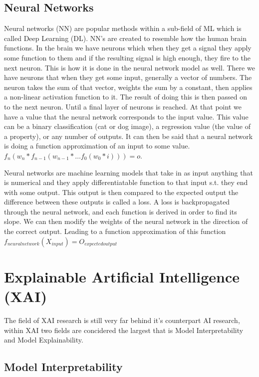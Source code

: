 \subsection{Neural Networks}

Neural networks (NN) are popular methods within a sub-field of ML which is called Deep Learning (DL). 
NN's are created to resemble how the human brain functions. In the brain we have neurons which 
when they get a signal they apply some function to them and if the resulting signal is high 
enough, they fire to the next neuron. This is how it is done in the neural network model as well.
There we have neurons that when they get some input, generally a vector of numbers. The neuron 
takes the sum of that vector, weights the sum by a constant, then applies a non-linear activation 
function to it. The result of doing this is then passed on to the next neuron. Until a final layer 
of neurons is reached. At that point we have a value that the neural network corresponds to the 
input value. This value can be a binary classification (cat or dog image), a regression value (the 
value of a property), or any number of outputs. It can then be said that a neural network is doing 
a function approximation of an input to some value. $f_n ( w_n * f_{n-1} (w_{n-1} * \dots f_0(w_0*i))) = o$. 

Neural networks are machine learning models that take in as input anything that is numerical 
and they apply differentiatable function to that input s.t. they end with some output. This 
output is then compared to the expected output the difference between these outputs is called 
a loss. A loss is backpropagated through the neural network, and each function is derived in 
order to find its slope. We can then modify the weights of the neural network in the direction 
of the correct output. Leading to a function approximation of this function
$f_{neuralnetwork}(X_{input}) = O_{expectedoutput}$

\section{Explainable Artificial Intelligence (XAI)}

The field of XAI research is still very far behind it's counterpart AI research,
within XAI two fields are concidered the largest that is Model Interpretability
and Model Explainability.

\subsection{Model Interpretability}


